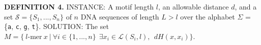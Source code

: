 \documentclass[oneside,12pt]{DISCSthesis}
\begin{document}
		\noindent\textbf{\boldmath DEFINITION 4.}
		\newline
		\noindent INSTANCE: A motif length $l$, an allowable distance $d$, and a set $\mathcal{S} = \{S_{1},..., S_{n}\}$\newline
		\noindent\hspace*{55pt}of $n$ DNA sequences of length $L > l$ over the alphabet $\Sigma$ = \{\texttt{a}, \texttt{c}, \texttt{g}, \texttt{t}\}.\newline
		\noindent SOLUTION: The set $M = \{\ l\text{-mer}\ x\ |\ \forall i \in \{1,...,n\}\ \ \exists x_i \in \mathcal{L}(S_i,l),\ \ dH(x, x_i) \}$.

\end{document}
